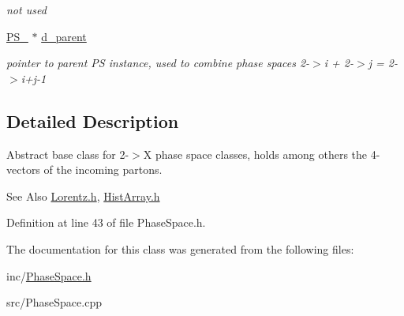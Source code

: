 \begin{DoxyCompactItemize}
\begin{DoxyCompactList}\small\item\em not used \end{DoxyCompactList}\item 
\hypertarget{classPS__2_abebb860c3c4a1c5054bc223d3aac4f45}{\hyperlink{classPS__2}{P\-S\-\_} $\ast$ \hyperlink{classPS__2_abebb860c3c4a1c5054bc223d3aac4f45}{d\-\_\-parent}}\label{classPS__2_abebb860c3c4a1c5054bc223d3aac4f45}

\begin{DoxyCompactList}\small\item\em pointer to parent P\-S instance, used to combine phase spaces 2-\/$>$i + 2-\/$>$j = 2-\/$>$i+j-\/1 \end{DoxyCompactList}\end{DoxyCompactItemize}


\subsection{Detailed Description}
Abstract base class for 2-\/$>$X phase space classes, holds among others the 4-\/vectors of the incoming partons. \begin{DoxySeeAlso}{See Also}
\hyperlink{Lorentz_8h}{Lorentz.\-h}, \hyperlink{HistArray_8h}{Hist\-Array.\-h} 
\end{DoxySeeAlso}


Definition at line 43 of file Phase\-Space.\-h.



The documentation for this class was generated from the following files\-:\begin{DoxyCompactItemize}
\item 
inc/\hyperlink{PhaseSpace_8h}{Phase\-Space.\-h}\item 
src/Phase\-Space.\-cpp\end{DoxyCompactItemize}

